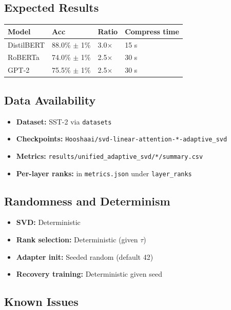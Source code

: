 \subsection{Expected Results}

\begin{table}[H]
\centering
\small
\begin{tabular}{llll}
\toprule
\textbf{Model} & \textbf{Acc} & \textbf{Ratio} & \textbf{Compress time} \\
\midrule
DistilBERT & 88.0\% $\pm$ 1\% & 3.0$\times$ & 15 s \\
RoBERTa & 74.0\% $\pm$ 1\% & 2.5$\times$ & 30 s \\
GPT-2 & 75.5\% $\pm$ 1\% & 2.5$\times$ & 30 s \\
\bottomrule
\end{tabular}
\end{table}

\subsection{Data Availability}

\begin{itemize}
\item \textbf{Dataset:} SST-2 via \texttt{datasets}
\item \textbf{Checkpoints:} \texttt{Hooshaai/svd-linear-attention-*-adaptive\_svd}
\item \textbf{Metrics:} \texttt{results/unified\_adaptive\_svd/*/summary.csv}
\item \textbf{Per-layer ranks:} in \texttt{metrics.json} under \texttt{layer\_ranks}

\end{itemize}
\subsection{Randomness and Determinism}

\begin{itemize}
\item \textbf{SVD:} Deterministic
\item \textbf{Rank selection:} Deterministic (given $\tau$)
\item \textbf{Adapter init:} Seeded random (default 42)
\item \textbf{Recovery training:} Deterministic given seed

\end{itemize}
\subsection{Known Issues}

